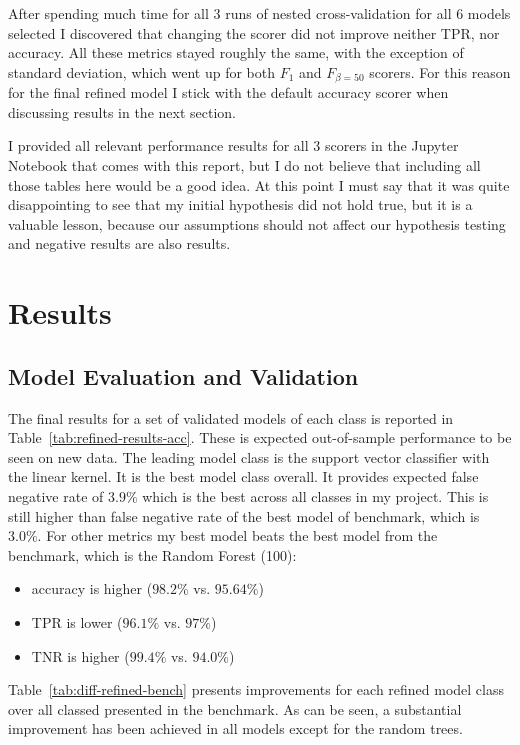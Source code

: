 \documentclass[10pt, a4paper]{article}
\begin{document}
After spending much time for all 3 runs of nested cross-validation for all 6 models selected I discovered that changing the scorer did not improve neither TPR, nor accuracy. All these metrics stayed roughly the same, with the exception of standard deviation, which went up for both $F_1$ and $F_{\beta=50}$ scorers. For this reason for the final refined model I stick with the default accuracy scorer when discussing results in the next section. 

I provided all relevant performance results for all 3 scorers in the Jupyter Notebook that comes with this report, but I do not believe that including all those tables here would be a good idea. At this point I must say that it was quite disappointing to see that my initial hypothesis did not hold true, but it is a valuable lesson, because our assumptions should not affect our hypothesis testing and negative results are also results.

\section{Results}
\label{sec:results}
\subsection{Model Evaluation and Validation}

The final results for a set of validated models of each class is reported in Table~\ref{tab:refined-results-acc}. These is expected out-of-sample performance to be seen on new data. The leading model class is the support vector classifier with the linear kernel. It is the best model class overall. It provides expected false negative rate of $3.9\%$ which is the best across all classes in my project. This is still higher than false negative rate of the best model of benchmark, which is $3.0\%$. For other metrics my best model beats the best model from the benchmark, which is the Random Forest (100):
\begin{itemize}
	\item accuracy is higher ($98.2\%$ vs. $95.64\%$) \smiley
		\item TPR is lower ($96.1\%$ vs. $97\%$) \frownie
	\item TNR is higher ($99.4\%$ vs. $94.0\%$) \smiley

\end{itemize}



Table~\ref{tab:diff-refined-bench} presents improvements for each refined model class over all classed presented in the benchmark. As can be seen, a substantial improvement has been achieved in all models except for the random trees.
\end{document}
